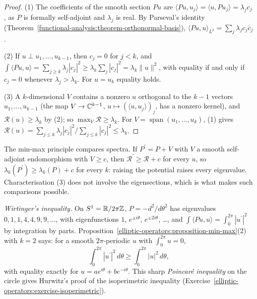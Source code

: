 \begin{proof}
(1) The coefficients of the smooth section $Pu$ are $\langle Pu, u_j\rangle = \langle u, Pu_j\rangle = \lambda_jc_j$, as $P$ is formally self-adjoint and $\lambda_j$ is real. By Parseval's identity
(Theorem~\ref{functional-analysis:theorem-orthonormal-basis}), $\langle Pu, u\rangle_{L^2} = \sum_j\lambda_jc_j\bar c_j$.

(2) If $u \perp u_1, \ldots, u_{k-1}$, then $c_j = 0$ for $j < k$, and $\int\langle Pu, u\rangle = \sum_{j \geq k}\lambda_j|c_j|^2 \geq \lambda_k\sum_j|c_j|^2 = \lambda_k\|u\|^2$, with equality if and only if $c_j = 0$ whenever
$\lambda_j > \lambda_k$. For $u = u_k$ equality holds.

(3) A $k$-dimensional $V$ contains a nonzero $u$ orthogonal to the $k - 1$ vectors $u_1, \ldots, u_{k-1}$ (the map $V \to \mathbb{C}^{k-1}$, $u \mapsto (\langle u, u_j\rangle)_j$, has a nonzero kernel), and
$\mathcal{R}(u) \geq \lambda_k$ by (2); so $\max_V\mathcal{R} \geq \lambda_k$. For $V = \operatorname{span}(u_1, \ldots, u_k)$, (1) gives $\mathcal{R}(u) = \sum_{j \leq k}\lambda_j|c_j|^2/\sum_{j \leq k}|c_j|^2 \leq \lambda_k$.
\end{proof}

The min-max principle compares spectra. If $P^{\prime} = P + V$ with $V$ a smooth self-adjoint endomorphism with $V \geq c$, then $\mathcal{R}^{\prime} \geq \mathcal{R} + c$ for every $u$, so $\lambda_k(P^{\prime}) \geq \lambda_k(P) + c$ for every $k$: raising
the potential raises every eigenvalue. Characterisation (3) does not involve the eigensections, which is what makes such comparisons possible.

\begin{example}\label{elliptic-operators:example-wirtinger}
\emph{Wirtinger's inequality.} On $S^1 = \mathbb{R}/2\pi\mathbb{Z}$, $P = -d^2/d\theta^2$ has eigenvalues $0, 1, 1, 4, 4, 9, 9, \ldots$, with eigenfunctions $1$, $e^{\pm i\theta}$, $e^{\pm2i\theta}$, \ldots, and
$\int\langle Pu, u\rangle = \int_0^{2\pi}|u^{\prime}|^2$ by integration by parts. Proposition~\ref{elliptic-operators:proposition-min-max}(2) with $k = 2$ says: for a smooth $2\pi$-periodic $u$ with $\int_0^{2\pi}u = 0$,
\[
\int_0^{2\pi}|u^{\prime}|^2\,d\theta \geq \int_0^{2\pi}|u|^2\,d\theta,
\]
with equality exactly for $u = ae^{i\theta} + be^{-i\theta}$. This sharp \emph{Poincar\'e inequality} on the circle gives Hurwitz's proof of the isoperimetric inequality
(Exercise~\ref{elliptic-operators:exercise-isoperimetric}).
\end{example}


